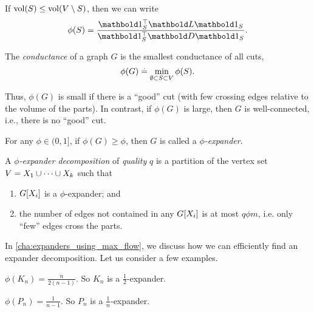 \begin{rmk}
If $\mathrm{vol}(S) \leq \mathrm{vol}(V \setminus S)$, then we can write \begin{align}
    \phi(\sS) = \frac{\trans{\vOne_\sS}\mL\vOne_\sS}{\trans{\vOne_\sS}\mD\vOne_\sS}.
\end{align}
\end{rmk}

\begin{defn}The \emph{conductance} of a graph $G$ is the smallest conductance of all cuts, \begin{align}
    \phi(G) \overset{.}{=} \min_{\emptyset \subset S \subset V} \phi(S).
\end{align}
\end{defn} Thus, $\phi(G)$ is small if there is a ``good'' cut (with few crossing edges relative to the volume of the parts). In contrast, if $\phi(G)$ is large, then $G$ is well-connected, i.e., there is no ``good'' cut.

\begin{defn} For any $\phi \in (0,1]$, if $\phi(G) \geq \phi$, then $G$ is called a \emph{$\phi$-expander}.

A \emph{$\phi$-expander decomposition} of \emph{quality} $q$ is a partition of the vertex set $V = X_1 \cup \dots \cup X_k$ such that \begin{enumerate}
    \item $G[X_i]$ is a $\phi$-expander; and
    \item the number of edges not contained in any $G[X_i]$ is at most $q \phi m$, i.e. only ``few'' edges cross the parts.
\end{enumerate}
\end{defn}

In \cref{cha:expanders_using_max_flow}, we discuss how we can efficiently find an expander decomposition. Let us consider a few examples.

\begin{exc}\label{exc:expander_complete_graph}
$\phi(K_n) = \frac{n}{2(n-1)}$. So $K_n$ is a $\frac{1}{2}$-expander.
\end{exc}

\begin{exc}\label{exc:expander_path_graph}
$\phi(P_n) = \frac{1}{n-1}$. So $P_n$ is a $\frac{1}{n}$-expander.
\end{exc}

